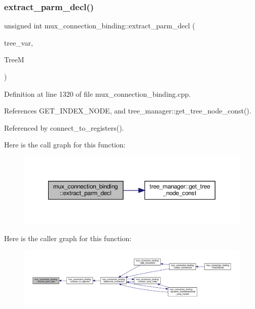 \subsubsection{\texorpdfstring{extract\+\_\+parm\+\_\+decl()}{extract\_parm\_decl()}}
{\footnotesize\ttfamily unsigned int mux\+\_\+connection\+\_\+binding\+::extract\+\_\+parm\+\_\+decl (\begin{DoxyParamCaption}\item[{unsigned int}]{tree\+\_\+var,  }\item[{const \hyperlink{tree__manager_8hpp_a96ff150c071ce11a9a7a1e40590f205e}{tree\+\_\+manager\+Ref}}]{TreeM }\end{DoxyParamCaption})\hspace{0.3cm}{\ttfamily [private]}}



Definition at line 1320 of file mux\+\_\+connection\+\_\+binding.\+cpp.



References G\+E\+T\+\_\+\+I\+N\+D\+E\+X\+\_\+\+N\+O\+DE, and tree\+\_\+manager\+::get\+\_\+tree\+\_\+node\+\_\+const().



Referenced by connect\+\_\+to\+\_\+registers().

Here is the call graph for this function\+:
\nopagebreak
\begin{figure}[H]
\begin{center}
\leavevmode
\includegraphics[width=350pt]{d7/d1e/classmux__connection__binding_af62b7f65acce2f389f49634b980c88a6_cgraph}
\end{center}
\end{figure}
Here is the caller graph for this function\+:
\nopagebreak
\begin{figure}[H]
\begin{center}
\leavevmode
\includegraphics[width=350pt]{d7/d1e/classmux__connection__binding_af62b7f65acce2f389f49634b980c88a6_icgraph}
\end{center}
\end{figure}
\mbox{\label{classmux__connection__binding_af8f6b0964f86f8cf2b503a0570a425e1}} 
